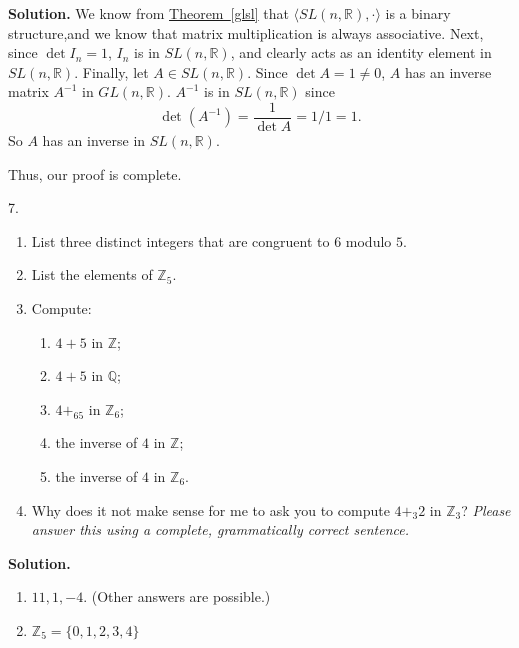 \documentclass[10pt,]{book}
\theoremstyle{plain}
\theoremstyle{definition}
\theoremstyle{definition}
\theoremstyle{definition}
\theoremstyle{definition}
\numberwithin{equation}{section}
\def\Z{\mathbb{Z}}
\def\R{\mathbb{R}}
\def\Q{\mathbb{Q}}
\begin{document}
\begin{exerciselist}
\par\smallskip
\noindent\textbf{Solution.}\hypertarget{solution-17}{}\quad
We know from \hyperref[glsl]{Theorem~\ref{glsl}} that \(\langle SL(n,\R),\cdot\rangle\) is a binary structure,and we know that matrix multiplication is always associative. Next, since \(\det I_n=1\), \(I_n\) is in \(SL(n,\R)\), and clearly acts as an identity element in \(SL(n,\R)\). Finally, let \(A\in SL(n,\R)\).  Since \(\det A=1\neq 0\), \(A\) has an inverse matrix \(A^{-1}\) in \(GL(n, \R)\).  \(A^{-1}\) is in \(SL(n,\R)\) since%
\begin{equation*}
\det(A^{-1})=\frac{1}{\det A}=1/1=1.
\end{equation*}
So \(A\) has an inverse in \(SL(n,\R)\).%
\par
Thus, our proof is complete.%
\item[7.]\hypertarget{exercise-18}{}\leavevmode%
\begin{enumerate}[label=(\alph*)]
\item\hypertarget{li-122}{}List three distinct integers that are congruent to \(6\) modulo \(5\).%
\item\hypertarget{li-123}{}List the elements of \(\Z_5\).%
\item\hypertarget{li-124}{}Compute: %
\begin{enumerate}[label=\roman*.]
\item\hypertarget{li-125}{}\(4+5\) in \(\Z\);%
\item\hypertarget{li-126}{}\(4+5\) in \(\Q\);%
\item\hypertarget{li-127}{}\(4+_65\) in \(\Z_6\);%
\item\hypertarget{li-128}{}the inverse of \(4\) in \(\Z\);%
\item\hypertarget{li-129}{}the inverse of \(4\) in \(\Z_6\).%
\end{enumerate}
%
\item\hypertarget{li-130}{}Why does it not make sense for me to ask you to compute \(4+_3 2\) in \(\Z_3\)? \emph{Please answer this using a complete, grammatically correct sentence.}%
\end{enumerate}
\par\smallskip
\par\smallskip
\noindent\textbf{Solution.}\hypertarget{solution-18}{}\quad
\leavevmode%
\begin{enumerate}[label=(\alph*)]
\item\hypertarget{li-131}{}\(11, 1, -4\). (Other answers are possible.)%
\item\hypertarget{li-132}{}\(\Z_5=\{0,1,2,3,4\}\)%

\end{enumerate}
\end{exerciselist}
\end{document}
